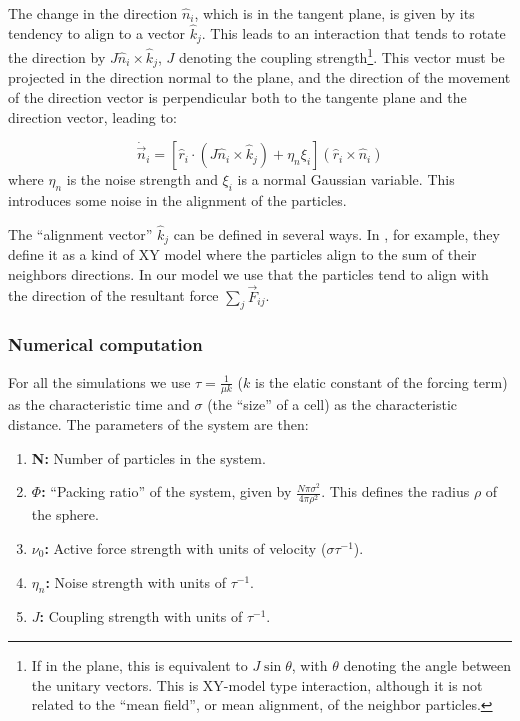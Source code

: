 \documentclass[12pt]{article}
\begin{document}
The change in the direction $\hat{n}_i$, which is in the tangent plane, is given by its tendency to align to a vector $\hat{k}_j$. This leads to an interaction that tends to rotate the direction by $J \hat{n}_i \times \hat{k}_j$, $J$ denoting the coupling strength\footnote{If in the plane, this is equivalent to $J\sin \theta$, with $\theta$ denoting the angle between the unitary vectors. This is XY-model type interaction, although it is not related to the ``mean field'', or mean alignment, of the neighbor particles.}. This vector must be projected in the direction normal to the plane, and the direction of the movement of the direction vector is perpendicular both to the tangente plane and the direction vector, leading to:

\begin{equation}
\dot{\vec{n}}_i = \left[ \hat{r}_i \cdot \left(J \hat{n}_i \times \hat{k}_j \right) + \eta_n \xi_i \right]\left( \hat{r}_i \times \hat{n}_i \right)
\end{equation}
where $\eta_n$ is the noise strength and $\xi_i$ is a normal Gaussian variable. This introduces some noise in the alignment of the particles.

The ``alignment vector'' $\hat{k}_j$ can be defined in several ways. In \cite{Sknepnek2014}, for example, they define it as a kind of XY model where the particles align to the sum of their neighbors directions. In our model we use that the particles tend to align with the direction of the resultant force $\sum_j \vec{F}_{ij}$.

\subsubsection{Numerical computation}

For all the simulations we use $\tau = \frac{1}{\mu k}$ ($k$ is the elatic constant of the forcing term) as the characteristic time and $\sigma$ (the ``size'' of a cell) as the characteristic distance. The parameters of the system are then:

\begin{enumerate}
\item{\textbf{N:}} Number of particles in the system.
\item{\textbf{$\Phi$:}} ``Packing ratio'' of the system, given by $\frac{N \pi \sigma^2}{4 \pi \rho^2}$. This defines the radius $\rho$ of the sphere.
\item{\textbf{$\nu_0$:}} Active force strength with units of velocity ($\sigma \tau^{-1}$).
\item{\textbf{$\eta_n$:}} Noise strength with units of $\tau^{-1}$.
\item{\textbf{$J$:}} Coupling strength with units of $\tau^{-1}$.
\end{enumerate}
\end{document}
